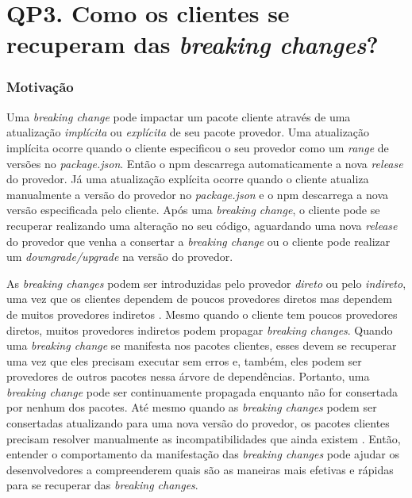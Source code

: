 
\section{QP3. Como os clientes se recuperam das \textit{breaking changes}?}
\label{sec:qp3}

\subsubsection{Motivação}
\label{sec:qp3:motivation}

Uma \textit{breaking change} pode impactar um pacote cliente através de uma atualização \textit{implícita} ou \textit{explícita} de seu pacote provedor. Uma atualização implícita ocorre quando o cliente especificou o seu provedor como um \textit{range} de versões no \textit{package.json}. Então o \textsf{npm} descarrega automaticamente a nova \textit{release} do provedor. Já uma atualização explícita ocorre quando o cliente atualiza manualmente a versão do provedor no \textit{package.json} e o \textsf{npm} descarrega a nova versão especificada pelo cliente. Após uma \textit{breaking change}, o cliente pode se recuperar realizando uma alteração no seu código, aguardando uma nova \textit{release} do provedor que venha a consertar a \textit{breaking change} ou o cliente pode realizar um \textit{downgrade/upgrade} na versão do provedor.

As \textit{breaking changes} podem ser introduzidas pelo provedor \textit{direto} ou pelo \textit{indireto}, uma vez que os clientes dependem de poucos provedores diretos mas dependem de muitos provedores indiretos \cite{npm-seven}. Mesmo quando o cliente tem poucos provedores diretos, muitos provedores indiretos podem propagar \textit{breaking changes}. Quando uma \textit{breaking change} se manifesta nos pacotes clientes, esses devem se recuperar uma vez que eles precisam executar sem erros e, também, eles podem ser provedores de outros pacotes nessa árvore de dependências. Portanto, uma \textit{breaking change} pode ser continuamente propagada enquanto não for consertada por nenhum dos pacotes. Até mesmo quando as \textit{breaking changes} podem ser consertadas atualizando para uma nova versão do provedor, os pacotes clientes precisam resolver manualmente as incompatibilidades que ainda existem \cite{Foo:2018:ESC:3236024.3275535}. Então, entender o comportamento da manifestação das \textit{breaking changes} pode ajudar os desenvolvedores a compreenderem quais são as maneiras mais efetivas e rápidas para se recuperar das \textit{breaking changes}.

